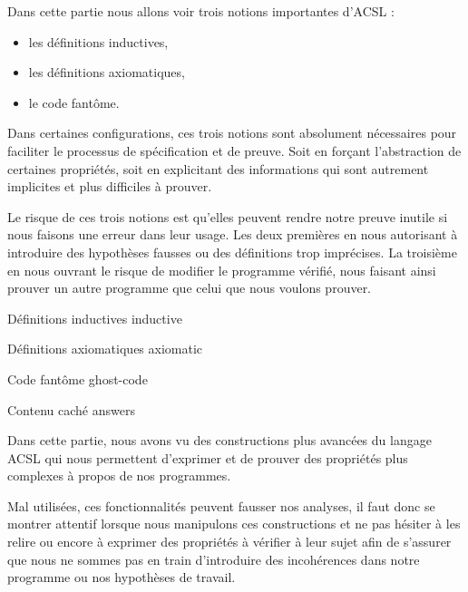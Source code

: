 Dans cette partie nous allons voir trois notions importantes d'ACSL :



\begin{itemize}
\item les définitions inductives,
\item les définitions axiomatiques,
\item le code fantôme.
\end{itemize}


Dans certaines configurations, ces trois notions sont absolument nécessaires
pour faciliter le processus de spécification et de preuve. Soit en forçant
l'abstraction de certaines propriétés, soit en explicitant des informations qui
sont autrement implicites et plus difficiles à prouver.



Le risque de ces trois notions est qu'elles peuvent rendre notre preuve inutile
si nous faisons une erreur dans leur usage. Les deux premières en nous
autorisant à introduire des hypothèses fausses ou des définitions trop
imprécises. La troisième en nous ouvrant le risque de modifier le programme
vérifié, nous faisant ainsi prouver un autre programme que celui que nous
voulons prouver.


\begin{levelTwo}
  {Définitions inductives}
  {inductive}
\end{levelTwo}


\begin{levelTwo}
  {Définitions axiomatiques}
  {axiomatic}
\end{levelTwo}


\begin{levelTwo}
  {Code fantôme}
  {ghost-code}
\end{levelTwo}


\begin{levelTwo}
  {Contenu caché}
  {answers}
\end{levelTwo}


\horizontalLine
\newpage


Dans cette partie, nous avons vu des constructions plus avancées du langage ACSL
qui nous permettent d'exprimer et de prouver des propriétés plus complexes à
propos de nos programmes.



Mal utilisées, ces fonctionnalités peuvent fausser nos analyses, il faut donc se
montrer attentif lorsque nous manipulons ces constructions et ne pas hésiter à
les relire ou encore à exprimer des propriétés à vérifier à leur sujet afin de
s'assurer que nous ne sommes pas en train d'introduire des incohérences dans
notre programme ou nos hypothèses de travail.
